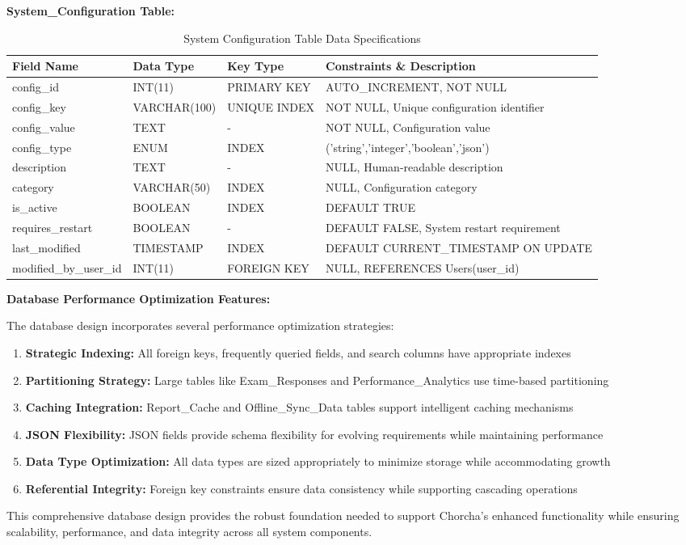 \documentclass[12pt,a4paper,oneside]{book}
\begin{document}
\textbf{System\_Configuration Table:}
\begin{table}[H]
\centering
\caption{System Configuration Table Data Specifications}
\footnotesize
\begin{tabular}{|L{3cm}|L{2.5cm}|L{1.5cm}|L{5cm}|}
\hline
\textbf{Field Name} & \textbf{Data Type} & \textbf{Key Type} & \textbf{Constraints \& Description} \\
\hline
config\_id & INT(11) & PRIMARY KEY & AUTO\_INCREMENT, NOT NULL \\
\hline
config\_key & VARCHAR(100) & UNIQUE INDEX & NOT NULL, Unique configuration identifier \\
\hline
config\_value & TEXT & - & NOT NULL, Configuration value \\
\hline
config\_type & ENUM & INDEX & ('string','integer','boolean','json') \\
\hline
description & TEXT & - & NULL, Human-readable description \\
\hline
category & VARCHAR(50) & INDEX & NULL, Configuration category \\
\hline
is\_active & BOOLEAN & INDEX & DEFAULT TRUE \\
\hline
requires\_restart & BOOLEAN & - & DEFAULT FALSE, System restart requirement \\
\hline
last\_modified & TIMESTAMP & INDEX & DEFAULT CURRENT\_TIMESTAMP ON UPDATE \\
\hline
modified\_by\_user\_id & INT(11) & FOREIGN KEY & NULL, REFERENCES Users(user\_id) \\
\hline
\end{tabular}
\end{table}

\textbf{Database Performance Optimization Features:}

The database design incorporates several performance optimization strategies:

\begin{enumerate}
    \item \textbf{Strategic Indexing:} All foreign keys, frequently queried fields, and search columns have appropriate indexes
    \item \textbf{Partitioning Strategy:} Large tables like Exam\_Responses and Performance\_Analytics use time-based partitioning
    \item \textbf{Caching Integration:} Report\_Cache and Offline\_Sync\_Data tables support intelligent caching mechanisms
    \item \textbf{JSON Flexibility:} JSON fields provide schema flexibility for evolving requirements while maintaining performance
    \item \textbf{Data Type Optimization:} All data types are sized appropriately to minimize storage while accommodating growth
    \item \textbf{Referential Integrity:} Foreign key constraints ensure data consistency while supporting cascading operations
\end{enumerate}
This comprehensive database design provides the robust foundation needed to support Chorcha's enhanced functionality while ensuring scalability, performance, and data integrity across all system components.
\end{document}
